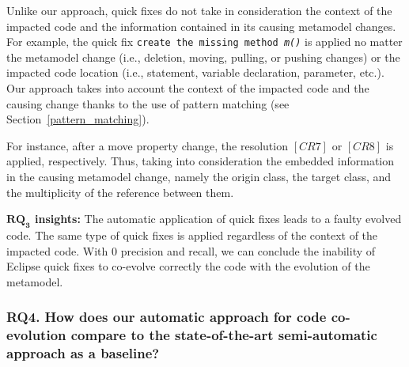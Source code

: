 
Unlike our approach, quick fixes do not take in consideration the context of the impacted code and the information contained in its causing metamodel changes. For example, the quick fix \texttt{create the missing method \emph{m()}} is applied no matter the metamodel change (i.e., deletion, moving, pulling, or pushing changes) or the impacted code location (i.e., statement, variable declaration, parameter, etc.). %
Our approach takes into account the context of the impacted code and the causing change thanks to the use of pattern matching (see Section~\ref{pattern_matching}). 


For instance, after a move property change, the resolution $[CR7]$ or $[CR8]$ is applied, respectively. Thus, taking into consideration the embedded information in the causing metamodel change, namely the origin class, the target class, and the multiplicity of the reference between them.



\begin{tcolorbox}[boxsep=-2pt]
\textbf{$\boldsymbol{RQ_3}$ insights:}
The automatic application of quick fixes leads to a faulty evolved code. The same type of quick fixes is applied regardless of the context of the impacted code. With 0 precision and recall, we can conclude the inability of Eclipse quick fixes to co-evolve correctly the code with the evolution of the metamodel. 
\red{}

\end{tcolorbox}



\subsubsection{RQ4. How does our automatic approach for code co-evolution compare to the state-of-the-art semi-automatic approach as a baseline?}

